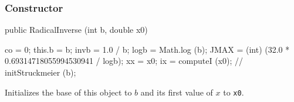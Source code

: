 \subsubsection* {Constructor}
\begin{code}

   public RadicalInverse (int b, double x0)\begin{hide} {
      co = 0;
      this.b = b;
      invb = 1.0 / b;
      logb = Math.log (b);
      JMAX = (int) (32.0 * 0.69314718055994530941 / logb);
      xx = x0;
      ix = computeI (x0);
//      initStruckmeier (b);
   }\end{hide}
\end{code}
 \begin{tabb}
    Initializes the  base of this object  to $b$
  and its first value of $x$ to \texttt{x0}.
 \end{tabb}
\begin{htmlonly}
\end{htmlonly}

